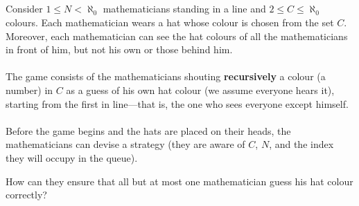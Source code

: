 \documentclass[11pt, a4paper, oneside]{article}
\theoremstyle{remark}
\theoremstyle{lemma}
\begin{document}
\newpage
\subsection{}
Consider \( 1 \leq N < \aleph_0 \) mathematicians standing in a line and \( 2 \leq C \leq \aleph_0 \) colours. Each mathematician wears a hat whose colour is chosen from the set \( C \). Moreover, each mathematician can see the hat colours of all the mathematicians in front of him, but not his own or those behind him.
\\\\
The game consists of the mathematicians shouting \textbf{recursively} a colour (a number) in \( C \) as a guess of his own hat colour (we assume everyone hears it), starting from the first in line—that is, the one who sees everyone except himself.
\\\\
Before the game begins and the hats are placed on their heads, the mathematicians can devise a strategy (they are aware of \( C \), \( N \), and the index they will occupy in the queue).

How can they ensure that all but at most one mathematician guess his hat colour correctly?
\end{document}
